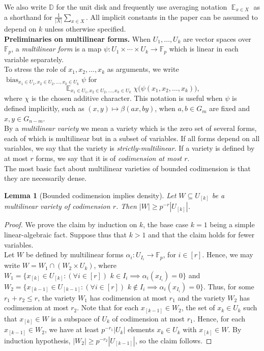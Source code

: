 \documentclass[a4paper,11pt]{article}
\newtheorem{lemma}[theorem]{Lemma}
\theoremstyle{definition}
\newcommand{\on}[1]{
	\operatorname{#1}
}
\newcommand{\tdt}{\times\cdots\times}
\newcommand\ex{\mathop{\mathbb{E}}}
\begin{document}
We also write $\mathbb{D}$ for the unit disk and frequently use averaging notation $\ex_{x \in X}$ as a shorthand for $\frac{1}{|X|} \sum_{x \in X}$. All implicit constants in the paper can be assumed to depend on $k$ unless otherwise specified.\\

\noindent\textbf{Preliminaries on multilinear forms.} When $U_1, \dots, U_k$ are vector spaces over $\mathbb{F}_p$, a \textit{multilinear form} is a map $\psi : U_1\tdt U_k \to \mathbb{F}_p$ which is linear in each variable separately.\\
\indent To stress the role of $x_1, x_2, \dots,  x_k$ as arguments, we write $\on{bias}_{x_1 \in U_1, x_2 \in U_2, \dots, x_k \in U_k} \psi$ for 
\[\ex_{x_1 \in U_1, x_2 \in U_2, \dots, x_k \in U_k} \chi\Big(\psi(x_1, x_2, \dots, x_k)\Big),\]
where $\chi$ is the chosen additive character. This notation is useful when $\psi$ is defined implicitly, such as $(x, y) \mapsto \beta(a x, by)$, when $a,b \in G_m$ are fixed and $x,y \in G_{n - m}$.\\

By a \textit{multilinear variety} we mean a variety which is the zero set of several forms, each of which is multilinear but in a subset of variables. If all forms depend on all variables, we say that the variety is \textit{strictly-multilinear}. If a variety is defined by at most $r$ forms, we say that it is of \textit{codimension at most $r$}.\\

The most basic fact about multilinear varieties of bounded codimension is that they are necessarily dense.

\begin{lemma}[Bounded codimension implies density]\label{bddcodimbound}
    Let $W \subseteq U_{[k]}$ be a multilinear variety of codimension $r$. Then $|W| \geq p^{-r}|U_{[k]}|$.
\end{lemma}

\begin{proof} We prove the claim by induction on $k$, the base case $k = 1$ being a simple linear-algebraic fact. Suppose thus that $k > 1$ and that the claim holds for fewer variables.\\
    \indent Let $W$ be defined by multilinear forms $\alpha_i : U_{I_i} \to \mathbb{F}_p$, for $i \in [r]$. Hence, we may write $W = W_1 \cap (W_2 \times U_k)$, where $W_1 = \{x_{[k]} \in U_{[k]} : (\forall i \in [r])\,\, k \in I_i \implies \alpha_i(x_{I_i}) = 0\}$ and $W_2 = \{x_{[k-1]} \in U_{[k-1]} : (\forall i \in [r]) \,\,k \notin I_i \implies \alpha_i(x_{I_i}) = 0\}$. Thus, for some $r_1 + r_2 \leq r$, the variety $W_1$ has codimension at most $r_1$ and the variety $W_2$ has codimension at most $r_2$. Note that for each $x_{[k-1]} \in W_2$, the set of $x_k \in U_k$ such that $x_{[k]} \in W$ is a subspace of $U_k$ of codimension at most $r_1$. Hence, for each $x_{[k-1]} \in W_2$, we have at least $p^{-r_1}|U_k|$ elements $x_k \in U_k$ with $x_{[k]} \in W$. By induction hypothesis, $|W_2| \geq p^{-r_2}|U_{[k-1]}|$, so the claim follows.
\end{proof}
\end{document}
